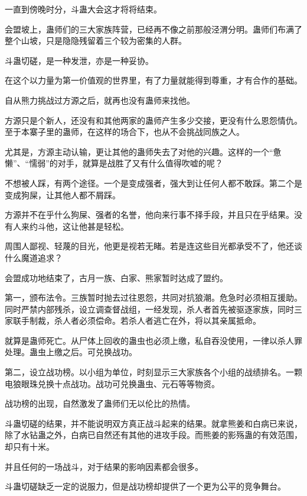 
\begin{this_body}

一直到傍晚时分，斗蛊大会这才将将结束。

会盟坡上，蛊师们的三大家族阵营，已经再不像之前那般泾渭分明。蛊师们布满了整个山坡，只是隐隐残留着三个较为密集的人群。

斗蛊切磋，是一种发泄，亦是一种妥协。

在这个以力量为第一价值观的世界里，有了力量就能得到尊重，才有合作的基础。

自从熊力挑战过方源之后，就再也没有蛊师来找他。

方源只是个新人，还没有和其他两家的蛊师产生多少交接，更没有什么恩怨情仇。至于本寨子里的蛊师，在这样的场合下，也从不会挑战同族之人。

尤其是，方源主动认输，更让其他的蛊师失去了对他的兴趣。这样的一个“惫懒”、“懦弱”的对手，就算是战胜了又有什么值得吹嘘的呢？

不想被人踩，有两个途径。一个是变成强者，强大到让任何人都不敢踩。第二个是变成狗屎，让其他人都不屑踩。

方源并不在乎什么狗屎、强者的名誉，他向来行事不择手段，并且只在乎结果。没有人来约斗他，这让他甚是轻松。

周围人鄙视、轻蔑的目光，他更是视若无睹。若是连这些目光都承受不了，他还谈什么魔道追求？

会盟成功地结束了，古月一族、白家、熊家暂时达成了盟约。

第一，颁布法令。三族暂时抛去过往恩怨，共同对抗狼潮。危急时必须相互援助。同时严禁内部残杀，设立调查督战组，一经发现，杀人者首先被驱逐家族，同时三家联手制裁，杀人者必须偿命。若杀人者逃亡在外，将以其亲属抵命。

就算是蛊师死亡。从尸体上回收的蛊虫也必须上缴，私自吞没使用，一律以杀人罪处理。蛊虫上缴之后。可兑换战功。

第二，设立战功榜。以小组为单位，时刻显示三大家族各个小组的战绩排名。一颗电狼眼珠兑换十点战功。战功可兑换蛊虫、元石等等物资。

战功榜的出现，自然激发了蛊师们无以伦比的热情。

斗蛊切磋的结果，并不能说明双方真正战斗起来的结果。就拿熊姜和白病已来说，除了水钻蛊之外，白病已自然还有其他的进攻手段。而熊姜的影殇蛊的有效范围，却只有十米。

并且任何的一场战斗，对于结果的影响因素都会很多。

斗蛊切磋缺乏一定的说服力，但是战功榜却提供了一个更为公平的竞争舞台。


\end{this_body}
